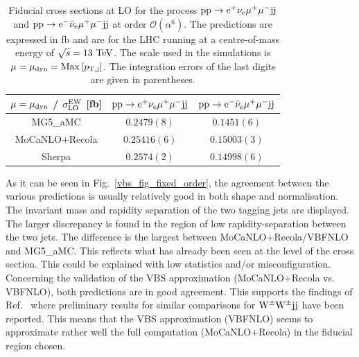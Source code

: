 \documentclass[11pt]{cernrep}
\begin{document}
\begin{table}
\begin{center} 
\begin{tabular}{ c | c | c }
 $\mu = \mu_{\rm dyn}$ / $\sigma_{\rm LO}^{\rm EW}$ [fb] & ${\rm p} {\rm p} \to {\rm e}^+  \nu_{\rm e}  \mu^+ \mu^- {\rm j} {\rm j}$  & ${\rm p} {\rm p} \to {\rm e}^-  \bar \nu_{\rm e}  \mu^+ \mu^- {\rm j} {\rm j}$  \\
  \hline\hline
  {\sc MG5\_aMC}                  & $0.2479(8)$  & $0.1451(6)$   \\
  {\sc MoCaNLO}+{\sc Recola}      & $0.25416(6)$  & $0.15003(3)$  \\
{\sc Sherpa}                      & $0.2574(2)$  & $0.14998(6)$   \\
  \hline
\end{tabular}
\end{center}
\caption{
Fiducial cross sections at LO for the process ${\rm p}{\rm p}\to{\rm e}^+\nu_{\rm e}\mu^+\mu^-{\rm j}{\rm j}$ and ${\rm p}{\rm p}\to{\rm e}^-\bar\nu_{\rm e}\mu^+\mu^-{\rm j}{\rm j}$ at order $\mathcal{O} (\alpha^6)$.
The predictions are expressed in fb and are for the LHC running at a centre-of-mass energy of $\sqrt{s}=13 {\rm~TeV}$.
The scale used in the simulations is $\mu = \mu_{\rm dyn} = {\rm Max}\left[p_{\rm T, j}\right]$.
The integration errors of the last digits are given in parentheses.}
\label{table:xsectLOdyn}
\end{table}

As it can be seen in Fig.~\ref{vbs_fig_fixed_order}, the agreement between the various predictions is usually relatively good in both shape and normalisation.
The invariant mass and rapidity separation of the two tagging jets are displayed.
The larger discrepancy is found in the region of low rapidity-separation between the two jets.
The difference is the largest between {\sc MoCaNLO}+{\sc Recola}/{\sc VBFNLO} and {\sc MG5\_aMC}.
This reflects what has already been seen at the level of the cross section.
This could be explained with low statistics and/or misconfiguration.
Concerning the validation of the VBS approximation ({\sc MoCaNLO}+{\sc Recola} vs. {\sc VBFNLO}), both predictions are in good agreement.
This supports the findings of Ref.~\cite{Anders:2018gfr} where preliminary results for similar comparisons for ${\rm W}^\pm{\rm W}^\pm{\rm j}{\rm j}$ have been reported.
This means that the VBS approximation ({\sc VBFNLO}) seems to approximate rather well the full computation ({\sc MoCaNLO}+{\sc Recola}) in the fiducial region chosen.
\end{document}

